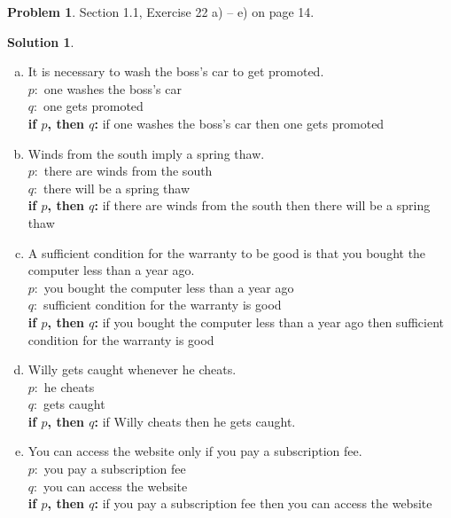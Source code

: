 \documentclass{article}
\theoremstyle{definition}
\newtheorem{problem}{Problem}
\newtheorem*{solution}{Solution}
\begin{document}
\begin{problem} Section 1.1, Exercise 22 a) -- e) on page 14.
\end{problem}
\begin{solution} \ \\
\begin{enumerate}[(a)]
  \item It is necessary to wash the boss’s car to get promoted. \\
  $p:$ one washes the boss's car \\
  $q:$ one gets promoted\\
  \textbf{if $p$, then $q$:} if one washes the boss's car then one gets promoted
  
  \item Winds from the south imply a spring thaw. \\
  $p:$ there are winds from the south \\
  $q:$ there will be a spring thaw \\
  \textbf{if $p$, then $q$:} if there are winds from the south then there will be a spring thaw
  
  \item A sufficient condition for the warranty to be good is that you bought the computer less than a year ago. \\
  $p:$ you bought the computer less than a year ago \\
  $q:$ sufficient condition for the warranty is good \\
  \textbf{if $p$, then $q$:} if you bought the computer less than a year ago then sufficient condition for the warranty is good
  
  \item Willy gets caught whenever he cheats. \\
  $p:$ he cheats \\
  $q:$ gets caught \\
  \textbf{if $p$, then $q$:} if Willy cheats then he gets caught.
  
  \item You can access the website only if you pay a subscription fee. \\
  $p:$ you pay a subscription fee \\
  $q:$ you can access the website \\
  \textbf{if $p$, then $q$:} if you pay a subscription fee then you can access the website

\end{enumerate}
\end{solution}
\end{document}
